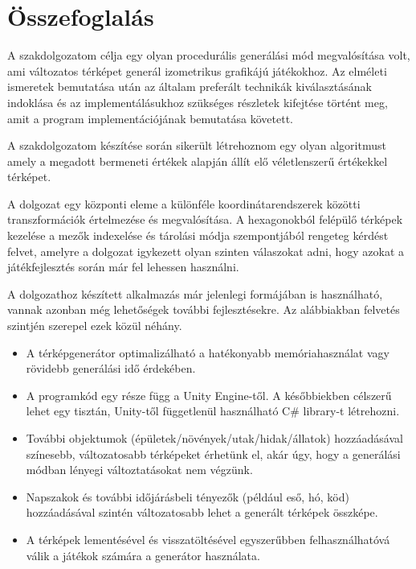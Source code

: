 \chapter*{Összefoglalás}

A szakdolgozatom célja egy olyan procedurális generálási mód megvalósítása volt, ami változatos térképet generál izometrikus grafikájú játékokhoz. Az elméleti ismeretek bemutatása után az általam preferált technikák kiválasztásának indoklása és az implementálásukhoz szükséges részletek kifejtése történt meg, amit a program implementációjának bemutatása követett.

A szakdolgozatom készítése során sikerült létrehoznom egy olyan algoritmust amely a megadott bermeneti értékek alapján állít elő véletlenszerű értékekkel térképet.

A dolgozat egy központi eleme a különféle koordinátarendszerek közötti transzformációk értelmezése és megvalósítása. A hexagonokból felépülő térképek kezelése a mezők indexelése és tárolási módja szempontjából rengeteg kérdést felvet, amelyre a dolgozat igykezett olyan szinten válaszokat adni, hogy azokat a játékfejlesztés során már fel lehessen használni.

\bigskip

A dolgozathoz készített alkalmazás már jelenlegi formájában is használható, vannak azonban még lehetőségek további fejlesztésekre. Az alábbiakban felvetés szintjén szerepel ezek közül néhány.
\begin{itemize}
\item A térképgenerátor optimalizálható a hatékonyabb memóriahasználat vagy rövidebb generálási idő érdekében.
\item A programkód egy része függ a Unity Engine-től. A későbbiekben célszerű lehet egy tisztán, Unity-től függetlenül használható C\# library-t létrehozni.
\item További objektumok (épületek/növények/utak/hidak/állatok) hozzáadásával színesebb, változatosabb térképeket érhetünk el, akár úgy, hogy a generálási módban lényegi változtatásokat nem végzünk.
\item Napszakok és további időjárásbeli tényezők (például eső, hó, köd) hozzáadásával szintén változatosabb lehet a generált térképek összképe.
\item A térképek lementésével és visszatöltésével egyszerűbben felhasználhatóvá válik a játékok számára a generátor használata.
\end{itemize}

